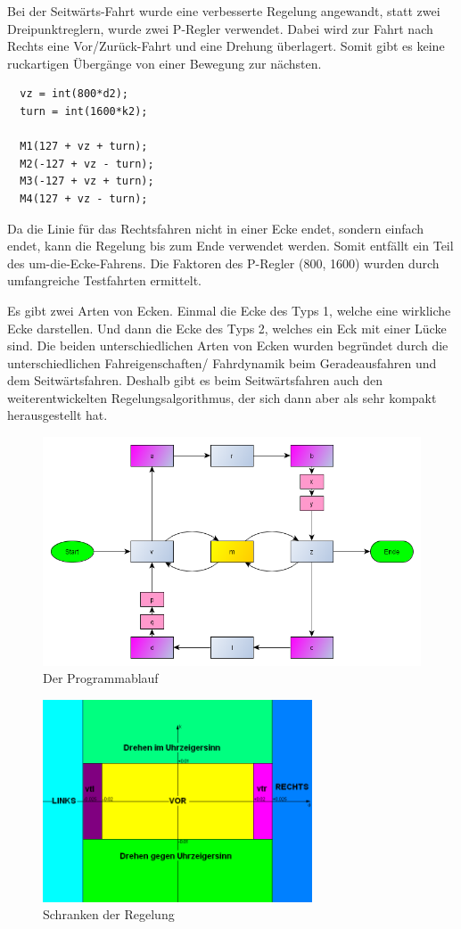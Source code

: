 \documentclass[a4paper,bibtotoc,oneside]{scrbook}
\begin{document}
Bei der Seitwärts-Fahrt wurde eine verbesserte Regelung angewandt, statt zwei Dreipunktreglern, wurde zwei P-Regler verwendet. Dabei wird zur Fahrt nach Rechts eine Vor/Zurück-Fahrt und eine Drehung überlagert. Somit gibt es keine ruckartigen Übergänge von einer Bewegung zur nächsten.

\begin{verbatim}
  vz = int(800*d2);
  turn = int(1600*k2);

  M1(127 + vz + turn);
  M2(-127 + vz - turn);
  M3(-127 + vz + turn);
  M4(127 + vz - turn); 
\end{verbatim}

Da die Linie für das Rechtsfahren nicht in einer Ecke endet, sondern einfach endet, kann die Regelung bis zum Ende verwendet werden. Somit entfällt ein Teil des um-die-Ecke-Fahrens. Die Faktoren des P-Regler (800, 1600) wurden durch umfangreiche Testfahrten ermittelt.

Es gibt zwei Arten von Ecken. Einmal die Ecke des Typs 1, welche eine wirkliche Ecke darstellen. Und dann die Ecke des Typs 2, welches ein Eck mit einer Lücke sind.
Die beiden unterschiedlichen Arten von Ecken wurden begründet durch die unterschiedlichen Fahreigenschaften/ Fahrdynamik beim Geradeausfahren und dem Seitwärtsfahren. Deshalb gibt es beim Seitwärtsfahren auch den weiterentwickelten Regelungsalgorithmus, der sich dann aber als sehr kompakt herausgestellt hat.

\begin{figure}[htbp]
\centering
\includegraphics[width=150mm]{img/ablauf2.png}
\caption{Der Programmablauf}\label{abl}
\end{figure}

\begin{figure}[htbp]
\centering
\includegraphics[width=80mm]{img/schranken.png}
\caption{Schranken der Regelung}\label{schr}
\end{figure}
\end{document}
